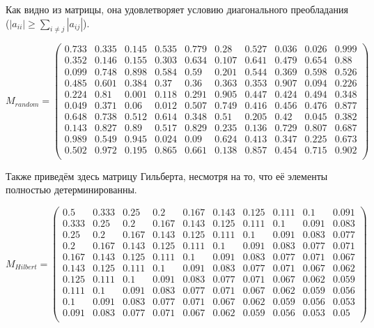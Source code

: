 \documentclass[../../report.tex]{subfiles}
\begin{document}
Как видно из матрицы, она удовлетворяет условию диагонального преобладания \\
($|a_{ii}| \geq \sum \limits_{i \neq j} |a_{ij}| $).

\[
    M_{random} = 
    \begin{pmatrix}
        0.733 & 0.335 & 0.145 & 0.535 & 0.779 & 0.28  & 0.527 & 0.036 & 0.026 & 0.999 \\
        0.352 & 0.146 & 0.155 & 0.303 & 0.634 & 0.107 & 0.641 & 0.479 & 0.654 & 0.88  \\
        0.099 & 0.748 & 0.898 & 0.584 & 0.59  & 0.201 & 0.544 & 0.369 & 0.598 & 0.526 \\
        0.485 & 0.601 & 0.384 & 0.37  & 0.36  & 0.363 & 0.353 & 0.907 & 0.094 & 0.226 \\
        0.224 & 0.81  & 0.001 & 0.118 & 0.291 & 0.905 & 0.447 & 0.424 & 0.494 & 0.348 \\
        0.049 & 0.371 & 0.06  & 0.012 & 0.507 & 0.749 & 0.416 & 0.456 & 0.476 & 0.877 \\
        0.648 & 0.738 & 0.512 & 0.614 & 0.348 & 0.51  & 0.205 & 0.42  & 0.045 & 0.382 \\
        0.143 & 0.827 & 0.89  & 0.517 & 0.829 & 0.235 & 0.136 & 0.729 & 0.807 & 0.687 \\
        0.989 & 0.549 & 0.945 & 0.024 & 0.09  & 0.624 & 0.413 & 0.347 & 0.225 & 0.673 \\
        0.502 & 0.972 & 0.195 & 0.865 & 0.661 & 0.138 & 0.857 & 0.454 & 0.715 & 0.902 \\

    \end{pmatrix}
\]

Также приведём здесь матрицу Гильберта, несмотря на то, что её элементы полностью детерминированны.

\[
    M_{Hilbert} =
    \begin{pmatrix}
        0.5   & 0.333 & 0.25  & 0.2   & 0.167 & 0.143 & 0.125 & 0.111 & 0.1   & 0.091 \\
        0.333 & 0.25  & 0.2   & 0.167 & 0.143 & 0.125 & 0.111 & 0.1   & 0.091 & 0.083 \\
        0.25  & 0.2   & 0.167 & 0.143 & 0.125 & 0.111 & 0.1   & 0.091 & 0.083 & 0.077 \\
        0.2   & 0.167 & 0.143 & 0.125 & 0.111 & 0.1   & 0.091 & 0.083 & 0.077 & 0.071 \\
        0.167 & 0.143 & 0.125 & 0.111 & 0.1   & 0.091 & 0.083 & 0.077 & 0.071 & 0.067 \\
        0.143 & 0.125 & 0.111 & 0.1   & 0.091 & 0.083 & 0.077 & 0.071 & 0.067 & 0.062 \\
        0.125 & 0.111 & 0.1   & 0.091 & 0.083 & 0.077 & 0.071 & 0.067 & 0.062 & 0.059 \\
        0.111 & 0.1   & 0.091 & 0.083 & 0.077 & 0.071 & 0.067 & 0.062 & 0.059 & 0.056 \\
        0.1   & 0.091 & 0.083 & 0.077 & 0.071 & 0.067 & 0.062 & 0.059 & 0.056 & 0.053 \\
        0.091 & 0.083 & 0.077 & 0.071 & 0.067 & 0.062 & 0.059 & 0.056 & 0.053 & 0.05  \\
    \end{pmatrix}
\]
\end{document}
